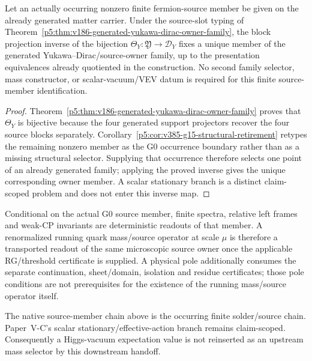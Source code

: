 \documentclass[12pt,a4paper]{article}
\begin{document}
\begin{theorem}
\label{p5:thm:v387-actual-source-unique-owner-member}
Let an actually occurring nonzero finite fermion-source member be given on the
already generated matter carrier.  Under the source-slot typing of
Theorem~\ref{p5:thm:v186-generated-yukawa-dirac-owner-family}, the block
projection inverse of the bijection
\(\Theta_Y:\mathfrak Y\to\mathscr D_Y\) fixes a unique member of the generated
Yukawa--Dirac/source-owner family, up to the presentation equivalences already
quotiented in the construction.  No second family selector, mass constructor,
or scalar-vacuum/VEV datum is required for this finite source-member
identification.
\end{theorem}
\begin{proof}
Theorem~\ref{p5:thm:v186-generated-yukawa-dirac-owner-family} proves that
\(\Theta_Y\) is bijective because the four generated support projectors recover
the four source blocks separately.  Corollary~\ref{p5:cor:v385-g15-structural-retirement}
retypes the remaining nonzero member as the G0 occurrence boundary rather than
as a missing structural selector.  Supplying that occurrence therefore selects
one point of an already generated family; applying the proved inverse gives the
unique corresponding owner member.  A scalar stationary branch is a distinct
claim-scoped problem and does not enter this inverse map.
\end{proof}

\begin{corollary}
\label{p5:cor:v387-downstream-source-ownership}
Conditional on the actual G0 source member, finite spectra, relative left
frames and weak-CP invariants are deterministic readouts of that member.  A
renormalized running quark mass/source operator at scale \(\mu\) is therefore a
transported readout of the same microscopic source owner once the applicable
RG/threshold certificate is supplied.  A physical pole additionally consumes
the separate continuation, sheet/domain, isolation and residue certificates;
those pole conditions are not prerequisites for the existence of the running
mass/source operator itself.
\end{corollary}

\begin{remark}
\label{p5:rem:v387-no-vev-reentry}
The native source-member chain above is the occurring finite solder/source
chain.  Paper~V-C's scalar stationary/effective-action branch remains
claim-scoped.  Consequently a Higgs-vacuum expectation value is not reinserted
as an upstream mass selector by this downstream handoff.
\end{remark}
\end{document}
